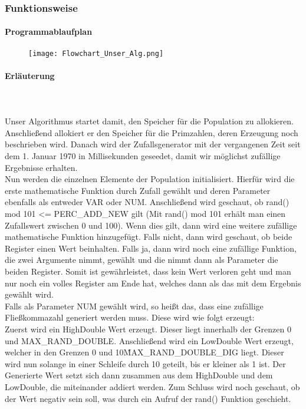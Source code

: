 \documentclass[a4paper,12pt]{article}
\begin{document}
\subsubsection{Funktionsweise}
\paragraph{Programmablaufplan}
\begin{figure}
\texttt{[image: Flowchart\_Unser\_Alg.png]}
\end{figure}
\newpage

\paragraph{Erläuterung}\hfill\\\\
Unser Algorithmus startet damit, den Speicher für die Population zu allokieren. Anschließend allokiert er den Speicher für die Primzahlen, deren Erzeugung noch beschrieben wird. Danach wird der Zufallsgenerator mit der vergangenen Zeit seit dem 1. Januar 1970 in Millisekunden geseedet, damit wir möglichst zufällige Ergebnisse erhalten. \\

\noindent Nun werden die einzelnen Elemente der Population initialisiert. Hierfür wird die erste mathematische Funktion durch Zufall gewählt und deren Parameter ebenfalls als entweder VAR oder NUM. Anschließend wird geschaut, ob rand() mod 101 <= PERC\_ADD\_NEW gilt (Mit rand() mod 101 erhält man einen Zufallswert zwischen 0 und 100).  Wenn dies gilt, dann wird eine weitere zufällige mathematische Funktion hinzugefügt. Falls nicht, dann wird geschaut, ob beide Register einen Wert beinhalten. Falls ja, dann wird noch eine zufällige Funktion, die zwei Argumente nimmt, gewählt und die nimmt dann als Parameter die beiden Register. Somit ist gewährleistet, dass kein Wert verloren geht und man nur noch ein volles Register am Ende hat, welches dann als das mit dem Ergebnis gewählt wird. \\

\noindent Falls als Parameter NUM gewählt wird, so heißt das, dass eine zufällige Fließkommazahl generiert werden muss. Diese wird wie folgt erzeugt:\\
\noindent Zuerst wird ein HighDouble Wert erzeugt. Dieser liegt innerhalb der Grenzen 0 und MAX\_RAND\_DOUBLE. Anschließend wird ein LowDouble Wert erzeugt, welcher in den Grenzen 0 und 10\^MAX\_RAND\_DOUBLE\_DIG liegt. Dieser wird nun solange in einer Schleife durch 10 geteilt, bis er kleiner als 1 ist. Der Generierte Wert setzt sich dann zusammen aus dem HighDouble und dem LowDouble, die miteinander addiert werden. Zum Schluss wird noch geschaut, ob der Wert negativ sein soll, was durch ein Aufruf der rand() Funktion geschieht. \\
\end{document}
